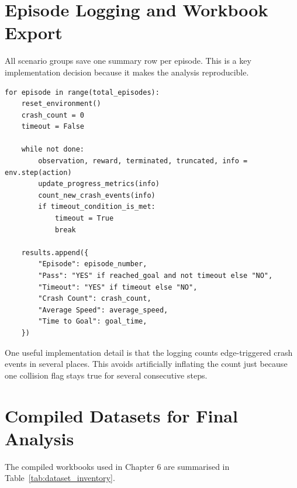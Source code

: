 \documentclass[12pt,a4paper]{report}
\begin{document}
\section{Episode Logging and Workbook Export}
All scenario groups save one summary row per episode. This is a key implementation decision because it makes the analysis reproducible.

\begin{lstlisting}[caption={Representative episode logging structure used across the batch scripts.},label={lst:logging_logic},float=H]
for episode in range(total_episodes):
    reset_environment()
    crash_count = 0
    timeout = False

    while not done:
        observation, reward, terminated, truncated, info = env.step(action)
        update_progress_metrics(info)
        count_new_crash_events(info)
        if timeout_condition_is_met:
            timeout = True
            break

    results.append({
        "Episode": episode_number,
        "Pass": "YES" if reached_goal and not timeout else "NO",
        "Timeout": "YES" if timeout else "NO",
        "Crash Count": crash_count,
        "Average Speed": average_speed,
        "Time to Goal": goal_time,
    })
\end{lstlisting}

One useful implementation detail is that the logging counts edge-triggered crash events in several places. This avoids artificially inflating the count just because one collision flag stays true for several consecutive steps.

\section{Compiled Datasets for Final Analysis}
The compiled workbooks used in Chapter 6 are summarised in Table~\ref{tab:dataset_inventory}.
\end{document}
